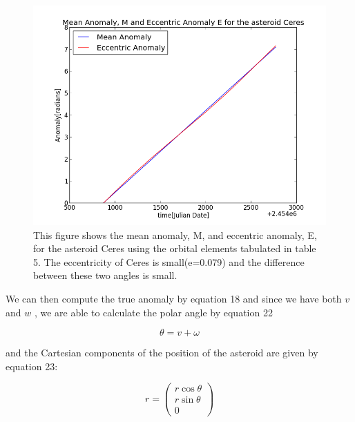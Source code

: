 \documentclass[letterpaper,12pt]{article}
\begin{document}
\FloatBarrier
\begin{figure}[h!]
\centering
\includegraphics[scale=0.5]{figure3.png}
\caption{This figure shows the mean anomaly, M, and eccentric anomaly, E, for the asteroid Ceres using the orbital elements tabulated in table 5. The eccentricity of Ceres is small(e=0.079) and the difference between these two angles is small.}
\end{figure}
\FloatBarrier


We can then compute the true anomaly by equation 18 and since we have both \begin{math} v \end{math} and \begin{math} w \end{math} , we are able to calculate the polar angle by equation 22

\begin{equation}
\theta = v + \omega
\end{equation}

and the Cartesian components of the position of the asteroid are given by equation 23:

\begin{equation}
r=
\begin{pmatrix}
  r\cos \theta \\
  r\sin \theta \\
  0
 \end{pmatrix} 
\end{equation}
\end{document}

